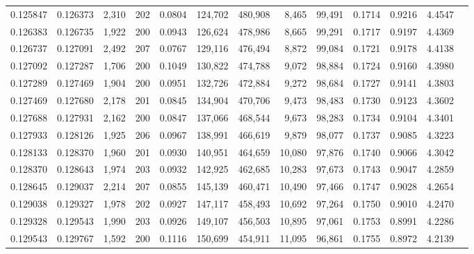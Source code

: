 \begin{tabular}{rrrrrrrrrrrrr}
0.125847 & 0.126373 & 2,310 & 202 &                                     0.0804 & 124,702 & 480,908 &   8,465 &  99,491 & 0.1714 & 0.9216 & 4.4547 \\
0.126383 & 0.126735 & 1,922 & 200 &                                     0.0943 & 126,624 & 478,986 &   8,665 &  99,291 & 0.1717 & 0.9197 & 4.4369 \\
0.126737 & 0.127091 & 2,492 & 207 &                                     0.0767 & 129,116 & 476,494 &   8,872 &  99,084 & 0.1721 & 0.9178 & 4.4138 \\
0.127092 & 0.127287 & 1,706 & 200 &                                     0.1049 & 130,822 & 474,788 &   9,072 &  98,884 & 0.1724 & 0.9160 & 4.3980 \\
0.127289 & 0.127469 & 1,904 & 200 &                                     0.0951 & 132,726 & 472,884 &   9,272 &  98,684 & 0.1727 & 0.9141 & 4.3803 \\
0.127469 & 0.127680 & 2,178 & 201 &                                     0.0845 & 134,904 & 470,706 &   9,473 &  98,483 & 0.1730 & 0.9123 & 4.3602 \\
0.127688 & 0.127931 & 2,162 & 200 &                                     0.0847 & 137,066 & 468,544 &   9,673 &  98,283 & 0.1734 & 0.9104 & 4.3401 \\
0.127933 & 0.128126 & 1,925 & 206 &                                     0.0967 & 138,991 & 466,619 &   9,879 &  98,077 & 0.1737 & 0.9085 & 4.3223 \\
0.128133 & 0.128370 & 1,960 & 201 &                                     0.0930 & 140,951 & 464,659 &  10,080 &  97,876 & 0.1740 & 0.9066 & 4.3042 \\
0.128370 & 0.128643 & 1,974 & 203 &                                     0.0932 & 142,925 & 462,685 &  10,283 &  97,673 & 0.1743 & 0.9047 & 4.2859 \\
0.128645 & 0.129037 & 2,214 & 207 &                                     0.0855 & 145,139 & 460,471 &  10,490 &  97,466 & 0.1747 & 0.9028 & 4.2654 \\
0.129038 & 0.129327 & 1,978 & 202 &                                     0.0927 & 147,117 & 458,493 &  10,692 &  97,264 & 0.1750 & 0.9010 & 4.2470 \\
0.129328 & 0.129543 & 1,990 & 203 &                                     0.0926 & 149,107 & 456,503 &  10,895 &  97,061 & 0.1753 & 0.8991 & 4.2286 \\
0.129543 & 0.129767 & 1,592 & 200 &                                     0.1116 & 150,699 & 454,911 &  11,095 &  96,861 & 0.1755 & 0.8972 & 4.2139 \\

\end{tabular}
